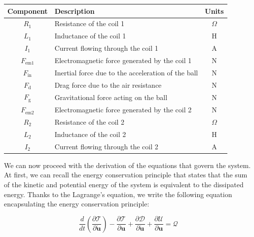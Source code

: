 \begin{table}[H]
    \centering
    \begin{tabular}{|c|l|c|}
        \hline
        \textbf{Component} & \textbf{Description}                               & \textbf{Units} \\
        \hline
        $R_1$              & Resistance of the coil 1                           & $\Omega$       \\
        $L_1$              & Inductance of the coil 1                           & H              \\
        $I_1$              & Current flowing through the coil 1                 & A              \\
        $F_{\text{em1}}$   & Electromagnetic force generated by the coil 1      & N              \\
        $F_{\text{in}}$    & Inertial force due to the acceleration of the ball & N              \\
        $F_{\text{d}}$     & Drag force due to the air resistance               & N              \\
        $F_{\text{g}}$     & Gravitational force acting on the ball             & N              \\
        $F_{\text{em2}}$   & Electromagnetic force generated by the coil 2      & N              \\
        $R_2$              & Resistance of the coil 2                           & $\Omega$       \\
        $L_2$              & Inductance of the coil 2                           & H              \\
        $I_2$              & Current flowing through the coil 2                 & A              \\
        \hline
    \end{tabular}
\end{table}

We can now proceed with the derivation of the equations that govern the system.
At first, we can recall the energy conservation principle that states that the sum of the kinetic and potential energy of the system is equivalent to the dissipated energy.
Thanks to the Lagrange's equation, we write the following equation encapsulating the energy conservation principle:

\begin{equation}
    \frac{d}{dt} \left( \frac{\partial \mathcal{T}}{\partial \dot{\mathbf{u}}} \right) - \frac{\partial \mathcal{T}}{\partial \mathbf{u}} + \frac{\partial \mathcal{D}}{\partial \dot{\mathbf{u}}} + \frac{\partial \mathcal{U}}{\partial \mathbf{u}} = \mathcal{Q}
    \label{eq:lagrange_equation}
\end{equation}

